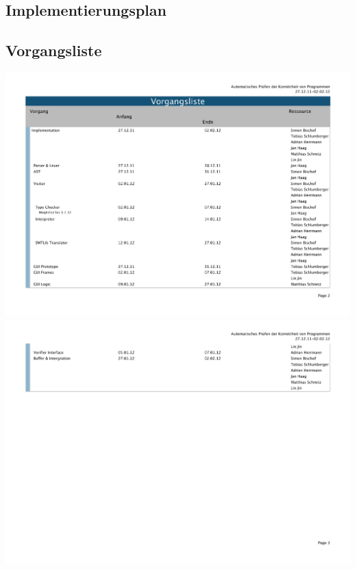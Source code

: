 \documentclass[10pt,a4paper,titlepage]{article}
\begin{document}
\begin{landscape}
\section{Implementierungsplan}
\subsection{Vorgangsliste}
\includegraphics[scale=0.7]{images/Implementierung_Vorgangsliste_1.pdf}
\newpage
\includegraphics[scale=0.7]{images/Implementierung_Vorgangsliste_2.pdf}
\newpage

\end{landscape}
\end{document}
